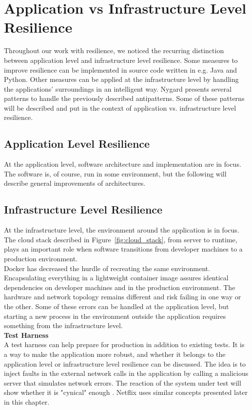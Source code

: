 \section{Application vs Infrastructure Level Resilience}
Throughout our work with resilience, we noticed the recurring distinction between application level and infrastructure level resilience. Some measures to improve resilience can be implemented in source code written in e.g. Java and Python. Other measures can be applied at the infrastructure level by handling the applications' surroundings in an intelligent way. Nygard presents several patterns to handle the previously described antipatterns. Some of these patterns will be described and put in the context of application vs. infrastructure level resilience.

\subsection*{Application Level Resilience}
At the application level, software architecture and implementation are in focus. The software is, of course, run in some environment, but the following will describe general improvements of architectures. \\




\subsection*{Infrastructure Level Resilience}
At the infrastructure level, the environment around the application is in focus. The cloud stack described in Figure~\ref{fig:cloud_stack}, from server to runtime, plays an important role when software transitions from developer machines to a production environment. \\

\noindent Docker has decreased the hurdle of recreating the same environment. Encapsulating everything in a lightweight container image assures identical dependencies on developer machines and in the production environment. The hardware and network topology remains different and risk failing in one way or the other. Some of these errors can be handled at the application level, but starting a new process in the environment outside the application requires something from the infrastructure level. \\

\noindent \textbf{Test Harness}
\\
A test harness can help prepare for production in addition to existing tests. It is a way to make the application more robust, and whether it belongs to the application level or infrastructure level resilience can be discussed. The idea is to inject faults in the external network calls in the application by calling a malicious server that simulates network errors. The reaction of the system under test will show whether it is "cynical" enough \cite[p. 111]{nygard2007release}. Netflix uses similar concepts presented later in this chapter. \\

